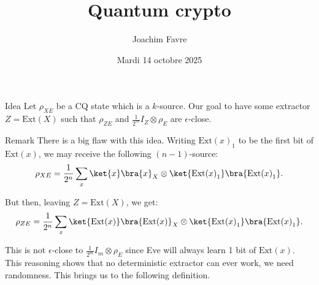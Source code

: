 \documentclass[a4paper]{article}
\title{Quantum crypto}
\author{Joachim Favre}
\date{Mardi 14 octobre 2025}
\begin{document}
\maketitle


\begin{parag}{Idea}
    Let $\rho_{XE}$ be a CQ state which is a $k$-source. Our goal to have some extractor $Z = \text{Ext}\left(X\right)$ such that $\rho_{ZE}$ and $\frac{1}{2^m} I_Z \otimes \rho_E$ are $\epsilon$-close.

    \begin{subparag}{Remark}
        There is a big flaw with this idea. Writing $\text{Ext}\left(x\right)_1$ to be the first bit of $\text{Ext}\left(x\right)$, we may receive the following $\left(n-1\right)$-source: 
        \[\rho_{XE} = \frac{1}{2^n} \sum_{x} \ket{x}\bra{x}_X \otimes \ket{\text{Ext}\left(x\right)_1}\bra{\text{Ext}\left(x\right)_1}.\]
        
        But then, leaving $Z = \text{Ext}\left(X\right)$, we get: 
        \[\rho_{ZE} = \frac{1}{2^n} \sum_{x} \ket{\text{Ext}\left(x\right)}\bra{\text{Ext}\left(x\right)}_X \otimes \ket{\text{Ext}\left(x\right)_1}\bra{\text{Ext}\left(x\right)_1}.\]
        
        This is not $\epsilon$-close to $\frac{1}{2^m} I_m \otimes \rho_E$ since Eve will always learn 1 bit of $\text{Ext}\left(x\right)$. This reasoning shows that no deterministic extractor can ever work, we need randomness. This brings us to the following definition.
    \end{subparag}
\end{parag}
\end{document}

